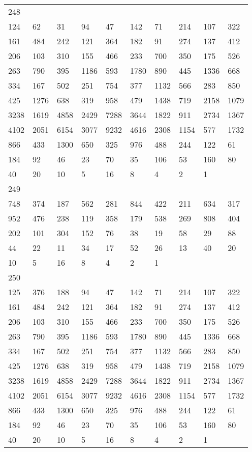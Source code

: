 \begin{longtable}{*{10}{l}}
248&&&&&&&&&\\
124& 62& 31& 94& 47& 142& 71& 214& 107& 322\\
161& 484& 242& 121& 364& 182& 91& 274& 137& 412\\
206& 103& 310& 155& 466& 233& 700& 350& 175& 526\\
263& 790& 395& 1186& 593& 1780& 890& 445& 1336& 668\\
334& 167& 502& 251& 754& 377& 1132& 566& 283& 850\\
425& 1276& 638& 319& 958& 479& 1438& 719& 2158& 1079\\
3238& 1619& 4858& 2429& 7288& 3644& 1822& 911& 2734& 1367\\
4102& 2051& 6154& 3077& 9232& 4616& 2308& 1154& 577& 1732\\
866& 433& 1300& 650& 325& 976& 488& 244& 122& 61\\
184& 92& 46& 23& 70& 35& 106& 53& 160& 80\\
40& 20& 10& 5& 16& 8& 4& 2& 1& \\

249&&&&&&&&&\\
748& 374& 187& 562& 281& 844& 422& 211& 634& 317\\
952& 476& 238& 119& 358& 179& 538& 269& 808& 404\\
202& 101& 304& 152& 76& 38& 19& 58& 29& 88\\
44& 22& 11& 34& 17& 52& 26& 13& 40& 20\\
10& 5& 16& 8& 4& 2& 1& \\

250&&&&&&&&&\\
125& 376& 188& 94& 47& 142& 71& 214& 107& 322\\
161& 484& 242& 121& 364& 182& 91& 274& 137& 412\\
206& 103& 310& 155& 466& 233& 700& 350& 175& 526\\
263& 790& 395& 1186& 593& 1780& 890& 445& 1336& 668\\
334& 167& 502& 251& 754& 377& 1132& 566& 283& 850\\
425& 1276& 638& 319& 958& 479& 1438& 719& 2158& 1079\\
3238& 1619& 4858& 2429& 7288& 3644& 1822& 911& 2734& 1367\\
4102& 2051& 6154& 3077& 9232& 4616& 2308& 1154& 577& 1732\\
866& 433& 1300& 650& 325& 976& 488& 244& 122& 61\\
184& 92& 46& 23& 70& 35& 106& 53& 160& 80\\
40& 20& 10& 5& 16& 8& 4& 2& 1& \\


\end{longtable}
